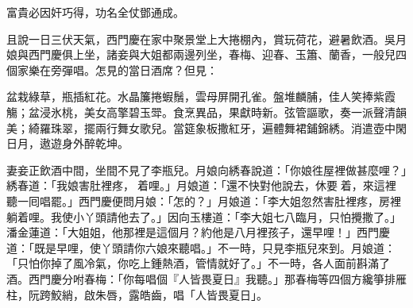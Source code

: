 \begin{myquote}
富貴必因奸巧得，功名全仗鄧通成。
\end{myquote}

且說一日三伏天氣，西門慶在家中聚景堂上大捲棚內，賞玩荷花，避暑飲酒。吳月娘與西門慶俱上坐，諸妾與大姐都兩邊列坐，春梅、迎春、玉簫、蘭香，一般兒四個家樂在旁彈唱。怎見的當日酒席？但見：

\begin{myquote}
盆栽綠草，瓶插紅花。水晶簾捲蝦鬚，雲母屏開孔雀。盤堆麟脯，佳人笑捧紫霞觴；盆浸氷桃，美女高擎碧玉斝。食烹異品，果獻時新。弦管謳歌，奏一派聲清韻美；綺羅珠翠，擺兩行舞女歌兒。當筵象板撒紅牙，遍體舞裙鋪錦綉。消遣壺中閑日月，遨遊身外醉乾坤。
\end{myquote}

妻妾正飲酒中間，坐間不見了李瓶兒。月娘向綉春說道：「你娘徃屋裡做甚麼哩？」綉春道：「我娘害肚裡疼，𢱉着哩。」月娘道：「還不快對他說去，休要𢱉着，來這裡聽一囘唱罷。」西門慶便問月娘：「怎的？」月娘道：「李大姐忽然害肚裡疼，房裡躺着哩。我使小丫頭請他去了。」因向玉樓道：「李大姐七八臨月，只怕攪撒了。」潘金蓮道：「大姐姐，他那裡是這個月？約他是八月裡孩子，還早哩！」西門慶道：「既是早哩，使丫頭請你六娘來聽唱。」不一時，只見李瓶兒來到。月娘道：「只怕你掉了風冷氣，你吃上鍾熱酒，管情就好了。」不一時，各人面前斟滿了酒。西門慶分咐春梅：「你每唱個『人皆畏夏日』我聽。」那春梅等四個方纔箏排雁柱，阮跨鮫綃，啟朱唇，露皓齒，唱「人皆畏夏日」。

